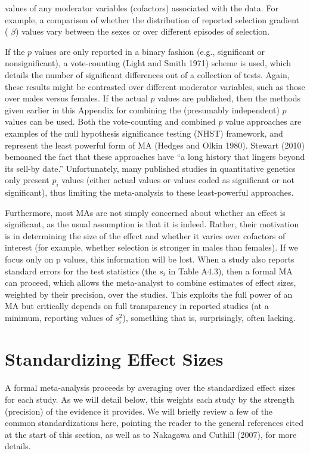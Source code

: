 \documentclass{article}
\begin{document}
values of any moderator variables (cofactors) associated with the data. For example, a comparison of whether the distribution of reported selection gradient ( $ \beta $) values vary between the sexes or over different episodes of selection.

If the $p$ values are only reported in a binary fashion (e.g., significant or nonsignificant), a vote-counting (Light and Smith 1971) scheme is used, which details the number of significant differences out of a collection of tests. Again, these results might be contrasted over different moderator variables, such as those over males versus females. If the actual $p$ values are published, then the methods given earlier in this Appendix for combining the (presumably independent) $p$ values can be used. Both the vote-counting and combined $p$ value approaches are examples of the null hypothesis significance testing (NHST) framework, and represent the least powerful form of MA (Hedges and Olkin 1980). Stewart (2010) bemoaned the fact that these approaches have “a long history that lingers beyond its sell-by date.” Unfortunately, many published studies in quantitative genetics only present $p_{i}$ values (either actual values or values coded as significant or not significant), thus limiting the meta-analysis to these least-powerful approaches.

Furthermore, most MAs are not simply concerned about whether an effect is significant, as the usual assumption is that it is indeed. Rather, their motivation is in determining the size of the effect and whether it varies over cofactors of interest (for example, whether selection is stronger in males than females). If we focus only on p values, this information will be lost. When a study also reports standard errors for the test statistics (the  $ s_i $ in Table A4.3), then a formal MA can proceed, which allows the meta-analyst to combine estimates of effect sizes, weighted by their precision, over the studies. This exploits the full power of an MA but critically depends on full transparency in reported studies (at a minimum, reporting values of  $ s_i^2 $), something that is, surprisingly, often lacking.

\section{Standardizing Effect Sizes}
A formal meta-analysis proceeds by averaging over the standardized effect sizes for each study. As we will detail below, this weights each study by the strength (precision) of the evidence it provides. We will briefly review a few of the common standardizations here, pointing the reader to the general references cited at the start of this section, as well as to Nakagawa and Cuthill (2007), for more details.
\end{document}
